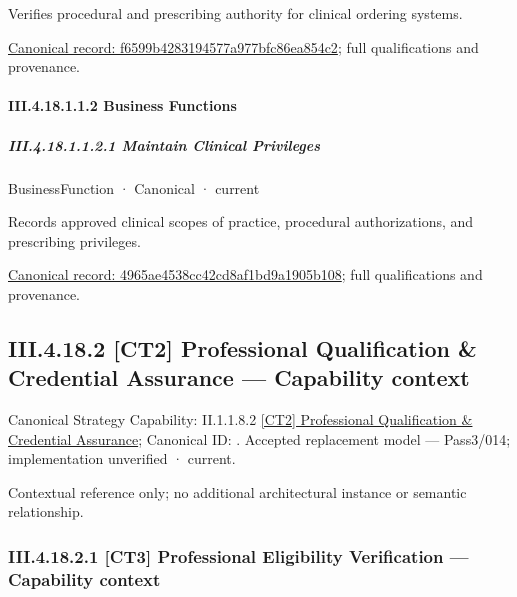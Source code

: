 Verifies procedural and prescribing authority for clinical ordering systems.


{\footnotesize \href{../../../../../../../continuum/business/business-service/f6599b4283194577a977bfc86ea854c2.md}{Canonical record: f6599b4283194577a977bfc86ea854c2}; full qualifications and provenance.}\par
\paragraph*{III.4.18.1.1.2 Business Functions}
\label{navigation:III.4.18.1.1.2}

\subparagraph*{III.4.18.1.1.2.1 Maintain Clinical Privileges}
\label{navigation:III.4.18.1.1.2.1}

\label{element:4965ae4538cc42cd8af1bd9a1905b108}
{\small BusinessFunction · Canonical · current}\par

Records approved clinical scopes of practice, procedural authorizations, and prescribing privileges.


{\footnotesize \href{../../../../../../../continuum/business/business-function/4965ae4538cc42cd8af1bd9a1905b108.md}{Canonical record: 4965ae4538cc42cd8af1bd9a1905b108}; full qualifications and provenance.}\par
\subsection*{III.4.18.2 [CT2] Professional Qualification \& Credential Assurance — Capability context}
\label{navigation:III.4.18.2}

{\small Canonical Strategy Capability: II.1.1.8.2 \hyperref[element:364a54333b644107ba9ae3ecc76ba186]{[CT2] Professional Qualification \& Credential Assurance}; Canonical ID: \texttt{}. Accepted replacement model — Pass3/014; implementation unverified · current.}\par
Contextual reference only; no additional architectural instance or semantic relationship.\par
\subsubsection*{III.4.18.2.1 [CT3] Professional Eligibility Verification — Capability context}
\label{navigation:III.4.18.2.1}

